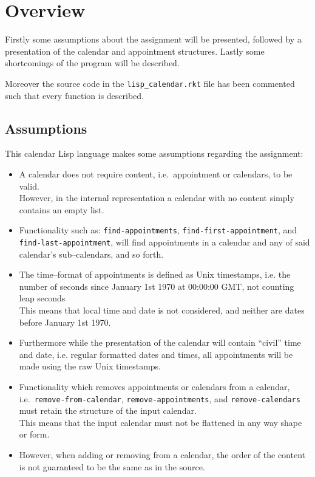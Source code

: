 \chapter{Overview}
Firstly some assumptions about the assignment will be presented, followed by a presentation of the calendar and appointment structures.
Lastly some shortcomings of the program will be described.

Moreover the source code in the \texttt{lisp\_calendar.rkt} file has been commented such that every function is described.

\section{Assumptions}
This calendar Lisp language makes some assumptions regarding the assignment:
\begin{itemize}
    \item A calendar does not require content, i.e.~appointment or calendars, to be valid.\\
        However, in the internal representation a calendar with no content simply contains an empty list.
    \item Functionality such as: \texttt{find-appointments}, \texttt{find-first-appointment}, and\\
        \texttt{find-last-appointment}, will find appointments in a calendar and any of said calendar's sub--calendars, and so forth.
    \item The time--format of appointments is defined as Unix timestamps, i.e. the number of seconds since January 1st 1970 at 00:00:00 GMT, not counting leap seconds\\
        This means that local time and date is not considered, and neither are dates before January 1st 1970.
    \item Furthermore while the presentation of the calendar will contain ``civil'' time and date, i.e. regular formatted dates and times,
        all appointments will be made using the raw Unix timestamps.
    \item Functionality which removes appointments or calendars from a calendar,\\
        i.e.~\texttt{remove-from-calendar}, \texttt{remove-appointments}, and \texttt{remove-calendars} must retain the structure of the input calendar.\\
        This means that the input calendar must not be flattened in any way shape or form.
    \item However, when adding or removing from a calendar, the order of the content is not guaranteed to be the same as in the source.
\end{itemize}


